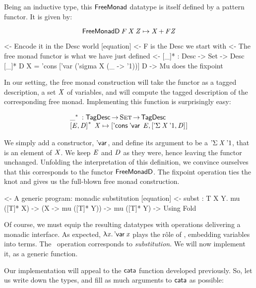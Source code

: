 Being an inductive type, this $\FMFreeMonad$ datatype is itself
defined by a pattern functor. It is given by:

\[
\FMFreeMonadD\: \V{F}\: \V{X}\: \V{Z} \mapsto \V{X} \mathop{\D{+}} \V{F} \V{Z}
\]

\begin{wstructure}
    <- Encode it in the Desc world [equation]
        <- F is the Desc we start with
        <- The free monad functor is what we have just defined
        <- [\_]* : Desc -> Set -> Desc
           [\_]* D X = 'cons ['var ('sigma X (\_ -> '1))] D
        -> Mu does the fixpoint
\end{wstructure}

In our setting, the free monad construction will take the functor as a
tagged description, a set $\V{X}$ of variables, and will compute the
tagged description of the corresponding free monad. Implementing this
function is surprisingly easy:

\[\stk{
\FreeMonad{\_} : \TagDesc \To \Set \To \TagDesc \\
\FreeMonad{\pair{\V{E}}{\V{D}}{}}\:\V{X} \mapsto
    \pair{\ListCons{\DVar{}}{\V{E}}}
         {\pair{\DSigma{\V{X}}{\DUnit}}{\V{D}}{}}{}
}\]

We simply add a constructor, $\DVar{\!}$, and define its argument to
be a $\DSigma{\V{X}}{\DUnit}$, that is an element of $\V{X}$. We keep
$\V{E}$ and $\V{D}$ as they were, hence leaving the functor
unchanged. Unfolding the interpretation of this definition, we
convince ourselves that this corresponds to the functor
$\FMFreeMonadD$. The fixpoint operation ties the knot and gives us
the full-blown free monad construction.

\begin{wstructure}
<- A generic program: monadic substitution [equation]
    <- subst : \forall T X Y. mu ([T]* X) -> (X -> mu ([T]* Y)) -> mu ([T]* Y)
        -> Using Fold
\end{wstructure}

Of course, we must equip the resulting datatypes with operations
delivering a monadic interface. As expected, \(\LAM{\x}\DVar{\x}\)
plays the r\^ole of \return, embedding variables into terms. The
\bind\ operation corresponds to \emph{substitution}. We will now
implement it, as a generic function.

Our implementation will appeal to the $\cata$ function developed
previously. So, let us write down the types, and fill as much
arguments to $\cata$ as possible:

\newcommand{\subst}{\F{subst}}
\newcommand{\apply}{\F{apply}}

